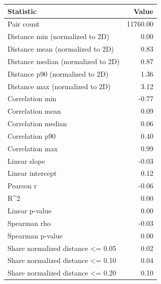 \begin{tabular}{lr}
\toprule
Statistic & Value \\
\midrule
Pair count & 11760.00 \\
Distance min (normalized to 2D) & 0.00 \\
Distance mean (normalized to 2D) & 0.83 \\
Distance median (normalized to 2D) & 0.87 \\
Distance p90 (normalized to 2D) & 1.36 \\
Distance max (normalized to 2D) & 3.12 \\
Correlation min & -0.77 \\
Correlation mean & 0.09 \\
Correlation median & 0.06 \\
Correlation p90 & 0.40 \\
Correlation max & 0.99 \\
Linear slope & -0.03 \\
Linear intercept & 0.12 \\
Pearson r & -0.06 \\
R^2 & 0.00 \\
Linear p-value & 0.00 \\
Spearman rho & -0.03 \\
Spearman p-value & 0.00 \\
Share normalized distance <= 0.05 & 0.02 \\
Share normalized distance <= 0.10 & 0.04 \\
Share normalized distance <= 0.20 & 0.10 \\
\bottomrule
\end{tabular}

